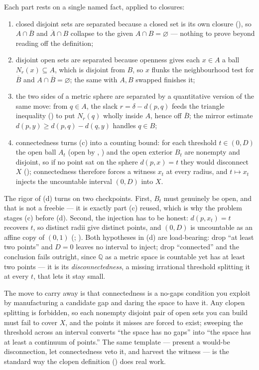 \documentclass[main.tex]{subfiles}
\begin{document}
\begin{Reflection}
Each part rests on a single named fact, applied to closures:
\begin{enumerate}[leftmargin=1.7em,itemsep=3pt,topsep=2pt,label=\textnormal{(\arabic*)}]
  \item closed disjoint sets are separated because a closed set is its own closure (), so
        $A\cap\overline{B}$ and $\overline{A}\cap B$ collapse to the given $A\cap B=\varnothing$ ---
        nothing to prove beyond reading off the definition;
  \item disjoint open sets are separated because openness gives each $x\in A$ a ball $N_{r}(x)\subseteq
        A$, which is disjoint from $B$, so $x$ flunks the neighbourhood test for $\overline{B}$ and
        $A\cap\overline{B}=\varnothing$; the same with $A,B$ swapped finishes it;
  \item the two sides of a metric sphere are separated by a quantitative version of the same move:
        from $q\in A$, the slack $r=\delta-d(p,q)$ feeds the triangle inequality () to put
        $N_{r}(q)$ wholly inside $A$, hence off $\overline{B}$; the mirror estimate
        $d(p,y)\ge d(p,q)-d(q,y)$ handles $q\in B$;
  \item connectedness turns (c) into a counting bound: for each threshold $t\in(0,D)$ the open ball
        $A_{t}$ (open by , ) and the open
        exterior $B_{t}$ are nonempty and disjoint, so if no point sat on the sphere $d(p,x)=t$ they
        would disconnect $X$ (); connectedness therefore forces a witness $x_{t}$ at every
        radius, and $t\mapsto x_{t}$ injects the uncountable interval $(0,D)$ into $X$.
\end{enumerate}

The rigor of (d) turns on two checkpoints. First, $B_{t}$ must genuinely be open, and that is not a
freebie --- it is exactly part (c) reused, which is why the problem stages (c) before (d). Second, the
injection has to be honest: $d(p,x_{t})=t$ recovers $t$, so distinct radii give distinct points, and
$(0,D)$ is uncountable as an affine copy of $(0,1)$ (; ). Both hypotheses in (d) are load-bearing: drop ``at least two points''
and $D=0$ leaves no interval to inject; drop ``connected'' and the conclusion fails outright, since
$\mathbb Q$ as a metric space is countable yet has at least two points --- it is its
\emph{disconnectedness}, a missing irrational threshold splitting it at every $t$, that lets it stay
small.

The move to carry away is that connectedness is a no-gaps condition you exploit by manufacturing a
candidate gap and daring the space to have it. Any clopen splitting is forbidden, so each nonempty
disjoint pair of open sets you can build must fail to cover $X$, and the points it misses are forced to
exist; sweeping the threshold across an interval converts ``the space has no gaps'' into ``the space
has at least a continuum of points.'' The same template --- present a would-be disconnection, let
connectedness veto it, and harvest the witness --- is the standard way the clopen definition
() does real work.
\end{Reflection}
\end{document}
